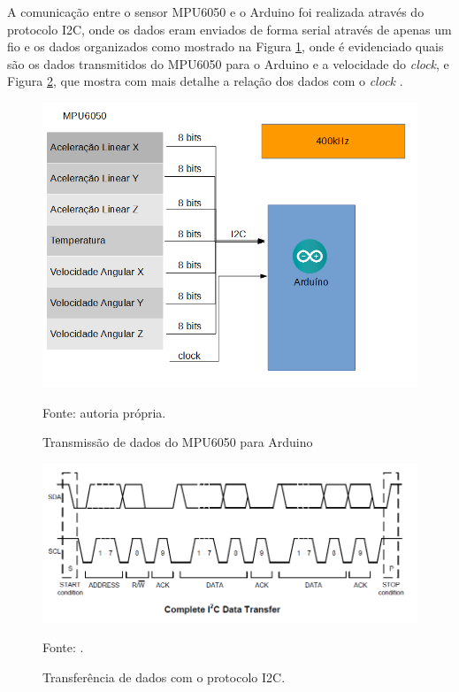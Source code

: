 		A comunicação entre o sensor MPU6050 e o Arduino foi realizada através do protocolo I2C, onde os dados eram enviados de forma serial através de apenas um fio e os dados organizados como mostrado na Figura \ref{comunicacao}, onde é evidenciado quais são os dados transmitidos do MPU6050 para o Arduino e a velocidade do \textit{clock}, e Figura \ref{i2c}, que mostra com mais detalhe a relação dos dados com o \textit{clock} .
		
		\begin{figure}[h]
			\centering
			\includegraphics[keepaspectratio=true,scale=0.4]{figuras/comunicacao.PNG}
			\caption{ Transmissão de dados do MPU6050 para Arduino}
			Fonte: autoria própria. 
			\label{comunicacao}	
		\end{figure}
		
		\begin{figure}[h]
			\centering
			\includegraphics[keepaspectratio=true,scale=0.5]{figuras/i2c.PNG}
			\caption{Transferência de dados com o protocolo I2C. }
			Fonte: \cite{mpu6050}. 
			\label{i2c}	
		\end{figure}
	
